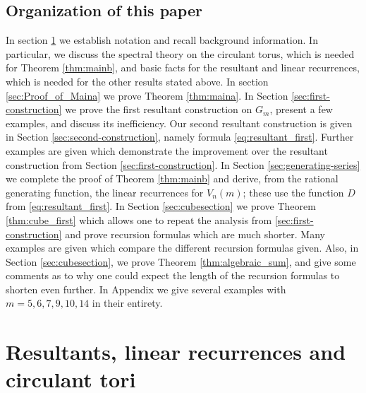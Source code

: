 \documentclass[11pt,reqno]{amsart}
\theoremstyle{remark}
\begin{document}
\subsection{Organization of this paper} In section \ref{sec:circulant-torus} we establish notation and
recall background information.  In particular, we discuss the spectral theory
on the circulant torus, which is needed for Theorem \ref{thm:mainb}, and basic facts for the resultant and linear recurrences, which
is needed for the other results stated above.  In section \ref{sec:Proof_of_Maina} we prove Theorem
\ref{thm:maina}.  In Section \ref{sec:first-construction} we prove the first resultant construction on $G_{m}$,
present a few examples, and discuss its inefficiency.   Our second
resultant construction is given in Section \ref{sec:second-construction}, namely formula \eqref{eq:resultant_first}.
Further examples are given which demonstrate the improvement over the resultant
construction from Section \ref{sec:first-construction}.  In Section \ref{sec:generating-series} we complete the proof of Theorem \ref{thm:mainb} and derive, from the rational
generating function, the linear recurrences for $V_n(m)$; these use the function $D$ from \eqref{eq:resultant_first}.  In Section \ref{sec:cubesection} we prove Theorem \ref{thm:cube_first} which allows one
to repeat the analysis from \ref{sec:first-construction} and prove recursion formulas which are much shorter.
Many examples are given which compare the different recursion formulas given.
Also, in Section \ref{sec:cubesection}, we prove Theorem \ref{thm:algebraic_sum}, and  give some comments as to why one could expect the length of the recursion
formulas to shorten even further.  In Appendix we give several examples  with $m=5,6,7,9,10,14$ in their entirety.


\section{Resultants, linear recurrences and circulant tori}
\label{sec:circulant-torus}
\end{document}
